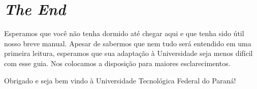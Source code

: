 \documentclass[a4paper,12pt,openany]{article}
\begin{document}
\newpage
\section{\textit{The End}}

Esperamos que você não tenha dormido até chegar aqui e que tenha sido útil nosso breve manual. Apesar de sabermos que nem tudo será entendido em uma primeira leitura, esperamos que sua adaptação à Universidade seja menos difícil com esse guia. Nos colocamos a disposição para maiores esclarecimentos. 

Obrigado e seja bem vindo à Universidade Tecnológica Federal do Paraná!
\end{document}
